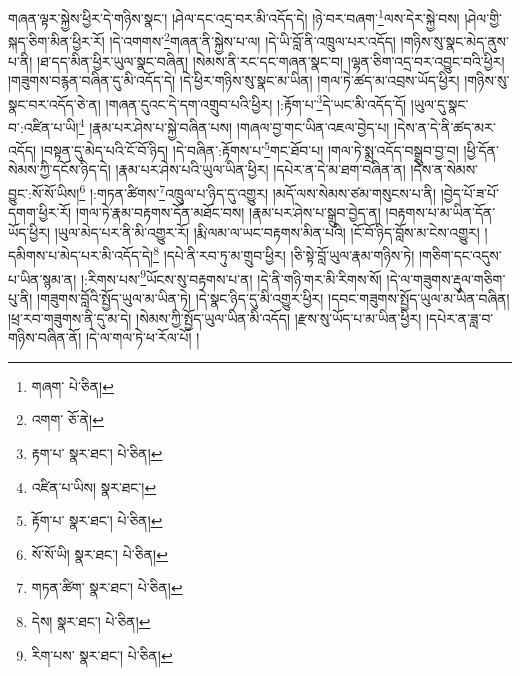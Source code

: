 གཞན་ལྟར་སྐྱེས་ཕྱིར་དེ་གཉིས་སྣང་། །ཤེལ་དང་འདྲ་བར་མི་འདོད་དེ། །ཉེ་བར་བཞག་\footnote{གཞག་  པེ་ཅིན། }ལས་དེར་སྐྱེ་བས། །ཤེལ་གྱི་སྐད་ཅིག་མིན་ཕྱིར་རོ། །དེ་འགགས་\footnote{འགག་  ཅོ་ནེ། }གཞན་ནི་སྐྱེས་པ་ལ། །དེ་ཡི་བློ་ནི་འཁྲུལ་པར་འདོད། །གཉིས་སུ་སྣང་མེད་ནུས་པ་ནི། །ཐ་དད་མིན་ཕྱིར་ཡུལ་སྣང་བཞིན། །སེམས་ནི་རང་དང་གཞན་སྣང་བ། །ལྷན་ཅིག་འདྲ་བར་འབྱུང་བའི་ཕྱིར། །གཟུགས་བརྙན་བཞིན་དུ་མི་འདོད་དེ། །དེ་ཕྱིར་གཉིས་སུ་སྣང་མ་ཡིན། །གལ་ཏེ་ཚད་མ་འབྲས་ཡོད་ཕྱིར། །གཉིས་སུ་སྣང་བར་འདོད་ཅེ་ན། །གཞན་དུའང་དེ་དག་འགྲུབ་པའི་ཕྱིར། །:རྟོག་པ་\footnote{རྟག་པ་  སྣར་ཐང་།  པེ་ཅིན། }དེ་ཡང་མི་འདོད་དོ། །ཡུལ་དུ་སྣང་བ་:འཛིན་པ་ཡི།\footnote{འཛིན་པ་ཡིས།  སྣར་ཐང་། } །རྣམ་པར་ཤེས་པ་སྐྱེ་བཞིན་པས། །གཞལ་བྱ་གང་ཡིན་འཇལ་བྱེད་པ། །དེས་ན་དེ་ནི་ཚད་མར་འདོད། །བསྟན་དུ་མེད་པའི་ངོ་བོ་ཉིད། །དེ་བཞིན་:རྟོགས་པ་\footnote{རྟོག་པ་  སྣར་ཐང་།  པེ་ཅིན། }གང་ཐོབ་པ། །གལ་ཏེ་སྨྲ་འདོད་བསྒྲུབ་བྱ་བ། །ཕྱི་དོན་སེམས་ཀྱི་དངོས་ཉིད་དེ། །རྣམ་པར་ཤེས་པའི་ཡུལ་ཡིན་ཕྱིར། །དཔེར་ན་དེ་མ་ཐག་བཞིན་ན། །དེས་ན་སེམས་བྱུང་:སོ་སོ་ཡིས།\footnote{སོ་སོ་ཡི།  སྣར་ཐང་།  པེ་ཅིན། } །:གཏན་ཚིགས་\footnote{གཏན་ཚིག་  སྣར་ཐང་།  པེ་ཅིན། }འཁྲུལ་པ་ཉིད་དུ་འགྱུར། །མདོ་ལས་སེམས་ཙམ་གསུངས་པ་ནི། །བྱེད་པོ་ཟ་པོ་དགག་ཕྱིར་རོ། །གལ་ཏེ་རྣམ་བརྟགས་དོན་མཐོང་བས། །རྣམ་པར་ཤེས་པ་སྒྲུབ་བྱེད་ན། །བརྟགས་པ་མ་ཡིན་དོན་ཡོད་ཕྱིར། །ཡུལ་མེད་པར་ནི་མི་འགྱུར་རོ། །རྨི་ལམ་ལ་ཡང་བརྟགས་མིན་པའི། །ངོ་བོ་ཉིད་བློས་མ་ངེས་འགྱུར། །དམིགས་པ་མེད་པར་མི་འདོད་དེ།\footnote{དེས།  སྣར་ཐང་།  པེ་ཅིན། } །དཔེ་ནི་རབ་ཏུ་མ་གྲུབ་ཕྱིར། །ཅི་སྟེ་བློ་ཡུལ་རྣམ་གཉིས་ཏེ། །གཅིག་དང་འདུས་པ་ཡིན་སྙམ་ན། །:རིགས་པས་\footnote{རིག་པས་  སྣར་ཐང་།  པེ་ཅིན། }ཡོངས་སུ་བརྟགས་པ་ན། །དེ་ནི་གཉི་གར་མི་རིགས་སོ། །དེ་ལ་གཟུགས་རྡུལ་གཅིག་པུ་ནི། །གཟུགས་བློའི་སྤྱོད་ཡུལ་མ་ཡིན་ཏེ། །དེ་སྣང་ཉིད་དུ་མི་འགྱུར་ཕྱིར། །དབང་གཟུགས་སྤྱོད་ཡུལ་མ་ཡིན་བཞིན། །ཕྲ་རབ་གཟུགས་ནི་དུ་མ་དེ། །སེམས་ཀྱི་སྤྱོད་ཡུལ་ཡིན་མི་འདོད། །རྫས་སུ་ཡོད་པ་མ་ཡིན་ཕྱིར། །དཔེར་ན་ཟླ་བ་གཉིས་བཞིན་ནོ། །དེ་ལ་གལ་ཏེ་ཕ་རོལ་པོ། །
